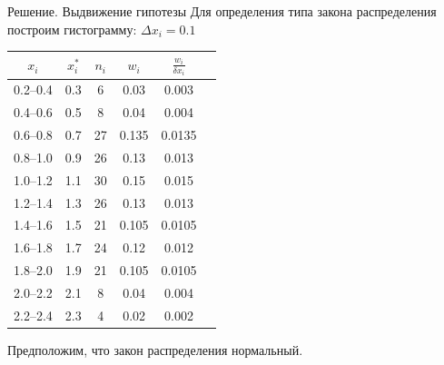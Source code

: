 \documentclass[unicode,11pt,notheorems,xcolor=table]{beamer}
\begin{document}
\begin{frame}[allowframebreaks]{Решение. Выдвижение гипотезы}
    Для определения типа закона распределения построим гистограмму:
    $\Delta x_i=0.1$

    {\centering
    \begin{tabular}{cccccc}
        $x_i $     &$x^*_i$& $n_i$ & $w_i$ & $\frac{w_i}{\delta x_i}$ \\
        \hline
        0.2--0.4   & 0.3   & 6     & 0.03   & 0.003     \\  
        0.4--0.6   & 0.5   & 8     & 0.04   & 0.004     \\ 
        0.6--0.8   & 0.7   & 27    & 0.135  & 0.0135    \\ 
        0.8--1.0   & 0.9   & 26    & 0.13   & 0.013     \\ 
        1.0--1.2   & 1.1   & 30    & 0.15   & 0.015     \\ 
        1.2--1.4   & 1.3   & 26    & 0.13   & 0.013     \\ 
        1.4--1.6   & 1.5   & 21    & 0.105  & 0.0105    \\ 
        1.6--1.8   & 1.7   & 24    & 0.12   & 0.012     \\ 
        1.8--2.0   & 1.9   & 21    & 0.105  & 0.0105    \\ 
        2.0--2.2   & 2.1   & 8     & 0.04   & 0.004     \\ 
        2.2--2.4   & 2.3   & 4     & 0.02   & 0.002     \\ 
        \hline
    \end{tabular} \par 
    }

    {\centering
    \par }
    Предположим, что закон распределения нормальный.
\end{frame}
\end{document}
